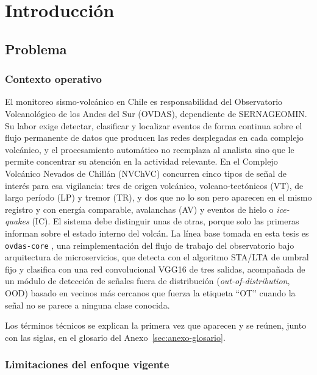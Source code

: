 \chapter{Introducción}
\label{cap:introduccion}

\section{Problema}
\label{sec:problema}

\subsection{Contexto operativo}

El monitoreo sismo-volcánico en Chile es responsabilidad del Observatorio
Volcanológico de los Andes del Sur (OVDAS), dependiente de SERNAGEOMIN. Su labor
exige detectar, clasificar y localizar eventos de forma continua sobre el flujo
permanente de datos que producen las redes desplegadas en cada complejo
volcánico, y el procesamiento automático no reemplaza al analista sino que le
permite concentrar su atención en la actividad relevante. En el Complejo
Volcánico Nevados de Chillán (NVChVC) concurren cinco tipos de señal de interés
para esa vigilancia: tres de origen volcánico, volcano-tectónicos (VT), de largo
período (LP) y tremor (TR), y dos que no lo son pero aparecen en el mismo
registro y con energía comparable, avalanchas (AV) y eventos de hielo o
\emph{ice-quakes} (IC). El sistema debe distinguir unas de otras, porque solo las
primeras informan sobre el estado interno del volcán. La línea base tomada en
esta tesis es \texttt{ovdas-core} \parencite{aracena2025ovdascore}, una
reimplementación del flujo de trabajo del observatorio bajo arquitectura de
microservicios, que detecta con el algoritmo STA/LTA
\parencite{allen1978stalta} de umbral fijo y clasifica con una red convolucional
VGG16 \parencite{simonyan2015vgg} de tres salidas, acompañada de un módulo de
detección de señales fuera de distribución (\emph{out-of-distribution}, OOD)
basado en vecinos más cercanos que fuerza la etiqueta \enquote{OT} cuando la
señal no se parece a ninguna clase conocida.

Los términos técnicos se explican la primera vez que aparecen y se reúnen,
junto con las siglas, en el glosario del Anexo~\ref{sec:anexo-glosario}.

\subsection{Limitaciones del enfoque vigente}
\label{subsec:limitaciones}

